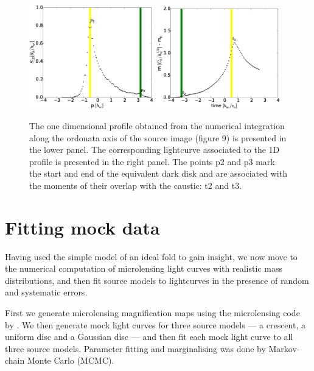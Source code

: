 \documentclass[usenatbib]{mn2e}
\begin{document}
\begin{figure}
\centering
    \includegraphics[width = 0.48\textwidth]{figures/M87_shape.eps}
        \includegraphics[width = 0.48\textwidth]{figures/M87_lc.eps}
\caption{\label{fig:M87_plots} The one dimensional profile obtained
  from the numerical integration along the ordonata axis of the source
  image (figure 9) is presented in the lower panel. The corresponding
  lightcurve associated to the 1D profile is presented in the right
  panel. The points p2 and p3 mark the start and end of the equivalent
  dark disk and are associated with the moments of their overlap with
  the caustic: t2 and t3.}
\end{figure}

\section{Fitting mock data}\label{sec:numerics}

Having used the simple model of an ideal fold to gain insight, we now
move to the numerical computation of microlensing light curves with
realistic mass distributions, and then fit source models to
lightcurves in the presence of random and systematic errors.

First we generate microlensing magnification maps using the
microlensing code by \cite{1999A&A...346L...5W}.  We then generate
mock light curves for three source models --- a crescent, a uniform
disc and a Gaussian disc --- and then fit each mock light curve to all
three source models. Parameter fitting and marginalising was done by
Markov-chain Monte Carlo (MCMC).
\end{document}
